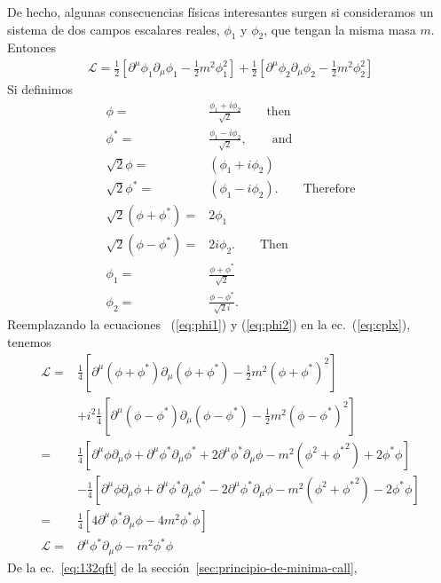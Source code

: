 De hecho, algunas consecuencias físicas interesantes surgen si consideramos un sistema de dos campos escalares reales, $\phi_1$ y $\phi_2$, que tengan la misma masa $m$. Entonces
\begin{align}
  \label{eq:cplx}
  \mathcal{L}=\frac{1}{2}[\partial^\mu\phi_1\partial_\mu\phi_1-\frac{1}{2}m^2\phi_1^2]+\frac{1}{2}[\partial^\mu\phi_2\partial_\mu\phi_2-\frac{1}{2}m^2\phi_2^2]
\end{align}                                                     
Si definimos
\begin{align}
  \label{eq:cplx_trans}
    \phi=&\frac{\phi_1+i\phi_2}{\sqrt{2}}\qquad\text{then}\\
    \phi^*=&\frac{\phi_1-i\phi_2}{\sqrt{2}},\qquad\text{and}\\
    \sqrt{2}\phi=&(\phi_1+i\phi_2)\nonumber\\
    \sqrt{2}\phi^*=&(\phi_1-i\phi_2).\qquad\text{Therefore}\nonumber\\
    \sqrt{2}(\phi+\phi^*)=&2\phi_1\nonumber\\
    \sqrt{2}(\phi-\phi^*)=&2i\phi_2.\qquad\text{Then}\nonumber\\
    \phi_1=&\frac{\phi+\phi^*}{\sqrt{2}}\label{eq:phi1}\\
    \phi_2=&\frac{\phi-\phi^*}{\sqrt{2}i}\label{eq:phi2}. %
\end{align}
Reemplazando la ecuaciones ~(\ref{eq:phi1})
y (\ref{eq:phi2}) %
en la ec.~(\ref{eq:cplx}), tenemos
\begin{align}
  \mathcal{L}=&\frac{1}{4}[\partial^\mu(\phi+\phi^*)\partial_\mu(\phi+\phi^*)-\frac{1}{2}m^2(\phi+\phi^*)^2]\nonumber\\
 & +i^2\frac{1}{4}[\partial^\mu(\phi-\phi^*)\partial_\mu(\phi-\phi^*)-\frac{1}{2}m^2(\phi-\phi^*)^2]\nonumber\\
 =&\frac{1}{4}[\partial^\mu\phi\partial_\mu\phi+\partial^\mu\phi^*\partial_\mu\phi^*+2\partial^\mu\phi^*\partial_\mu\phi-m^2(\phi^2+{\phi^*}^2)+2\phi^*\phi]\nonumber\\
   &-\frac{1}{4}[\partial^\mu\phi\partial_\mu\phi+\partial^\mu\phi^*\partial_\mu\phi^*-2\partial^\mu\phi^*\partial_\mu\phi-m^2(\phi^2+{\phi^*}^2)-2\phi^*\phi]\nonumber\\
 =&\frac{1}{4}[4\partial^\mu\phi^*\partial_\mu\phi-4m^2\phi^*\phi]\nonumber\\
 \label{eq:41qft}
\mathcal{L}=&\partial^\mu\phi^*\partial_\mu\phi-m^2\phi^*\phi
\end{align}
De la ec.~\eqref{eq:132qft} de la sección~\ref{sec:principio-de-minima-call}, 

